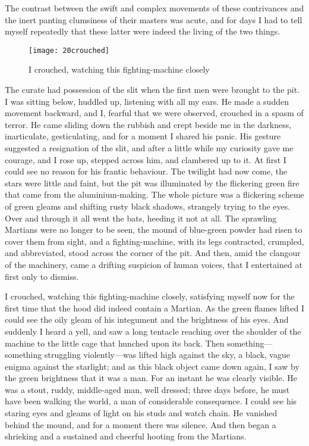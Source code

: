 The contrast between the swift and complex movements of these contrivances and the inert panting clumsiness of their masters was acute, and for days I had to tell myself repeatedly that these latter were indeed the living of the two things.

\begin{figure}[h!]
\centering
\texttt{[image: 20crouched]}
\caption{I crouched, watching this fighting-machine closely}
\end{figure}

The curate had possession of the slit when the first men were brought to the pit. I was sitting below, huddled up, listening with all my ears. He made a sudden movement backward, and I, fearful that we were observed, crouched in a spasm of terror. He came sliding down the rubbish and crept beside me in the darkness, inarticulate, gesticulating, and for a moment I shared his panic. His gesture suggested a resignation of the slit, and after a little while my curiosity gave me courage, and I rose up, stepped across him, and clambered up to it. At first I could see no reason for his frantic behaviour. The twilight had now come, the stars were little and faint, but the pit was illuminated by the flickering green fire that came from the aluminium-making. The whole picture was a flickering scheme of green gleams and shifting rusty black shadows, strangely trying to the eyes. Over and through it all went the bats, heeding it not at all. The sprawling Martians were no longer to be seen, the mound of blue-green powder had risen to cover them from sight, and a fighting-machine, with its legs contracted, crumpled, and abbreviated, stood across the corner of the pit. And then, amid the clangour of the machinery, came a drifting suspicion of human voices, that I entertained at first only to dismiss.

I crouched, watching this fighting-machine closely, satisfying myself now for the first time that the hood did indeed contain a Martian. As the green flames lifted I could see the oily gleam of his integument and the brightness of his eyes. And suddenly I heard a yell, and saw a long tentacle reaching over the shoulder of the machine to the little cage that hunched upon its back. Then something—something struggling violently—was lifted high against the sky, a black, vague enigma against the starlight; and as this black object came down again, I saw by the green brightness that it was a man. For an instant he was clearly visible. He was a stout, ruddy, middle-aged man, well dressed; three days before, he must have been walking the world, a man of considerable consequence. I could see his staring eyes and gleams of light on his studs and watch chain. He vanished behind the mound, and for a moment there was silence. And then began a shrieking and a sustained and cheerful hooting from the Martians.



